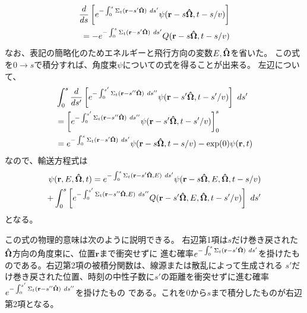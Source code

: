 \newcommand{\gs}{e^{ - \int_{0}^{s} \Sigma_t(\mathbf{r} - s'\SpcAng) \ ds' }}
\newcommand{\gsd}{e^{ - \int_{0}^{s'} \Sigma_t(\mathbf{r} - s''\SpcAng) \ ds'' }}
\newcommand{\rsO}{\mathbf{r} - s\SpcAng}
\newcommand{\rsdO}{\mathbf{r} - s'\SpcAng}
\newcommand{\tsv}{t - s/v}
\newcommand{\tsdv}{t - s'/v}
\begin{align}
  \frac{d}{ds} \left[ \gs \psi(\rsO, \tsv) \right] \notag\\
   = - \gs Q(\rsO, \tsv)
\end{align}
なお、表記の簡略化のためエネルギーと飛行方向の変数$E, \mathbf{\hat{\Omega}}$を省いた。
この式を$0 \rightarrow s$で積分すれば、角度束$\psi$についての式を得ることが出来る。
左辺について、
\begin{align}
  &\int_0^s \frac{d}{ds'} \left[ \gsd \psi(\rsdO, \tsdv) \right] \ ds' \notag \\
  &= \left[ \gsd \psi(\rsdO, \tsdv) \right]_0^s \notag \\
  &= \gs \psi(\rsO, \tsv) - \mathrm{exp}(0) \psi(\mathbf{r}, t)
\end{align}
なので、輸送方程式は
\begin{align}
  \psi(\rEOt) = e^{-\int_{0}^{s} \Sigma_t(\mathbf{r} - s'\SpcAng, E) \ ds'} \psi(\rsO, E, \SpcAng, \tsv) \notag \\
  + \int_0^s \left[ e^{-\int_{0}^{s'} \Sigma_t(\mathbf{r} - s''\SpcAng, E) \ ds''} Q(\rsdO, E, \SpcAng, \tsdv) \right] \ ds' \label{int-trans-pre}
\end{align}
となる。

この式の物理的意味は次のように説明できる。
右辺第1項は$s$だけ巻き戻された$\mathbf{\hat{\Omega}}$方向の角度束に、位置$\mathbf{r}$まで衝突せずに
進む確率$\gs$を掛けたものである。右辺第2項の被積分関数は、線源または散乱によって生成される
$s'$だけ巻き戻された位置、時刻の中性子数に$s'$の距離を衝突せずに進む確率$\gsd$を掛けたもの
である。これを$0$から$s$まで積分したものが右辺第2項となる。

